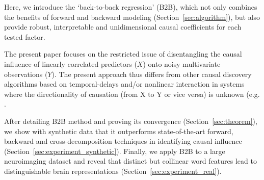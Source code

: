 Here, we introduce the `back-to-back regression' (B2B), which not only combines the benefits of forward and backward modeling (Section~\ref{sec:algorithm}), but also provide robust, interpretable and unidimensional causal coefficients for each tested factor.

The present paper focuses on the restricted issue of disentangling the causal influence of linearly correlated predictors ($X$) onto noisy multivariate observations ($Y$). The present approach thus differs from other causal discovery algorithms based on temporal-delays and/or nonlinear interaction in systems where the directionality of causation (from X to Y or vice versa) is unknown (e.g. \citep{peters2017elements, granger1969investigating, janzing2013quantifying, scholkopf2016modeling}.

After detailing B2B method and proving its convergence (Section~\ref{sec:theorem}), we show with synthetic data that it outperforms state-of-the-art forward, backward and cross-decomposition techniques in identifying causal influence (Section~\ref{sec:experiment_synthetic}). Finally, we apply B2B to a large neuroimaging dataset and reveal that distinct but collinear word features lead to distinguishable brain representations (Section~\ref{sec:experiment_real}).
